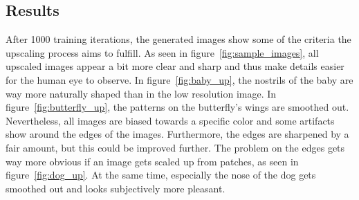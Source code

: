 \documentclass[11pt,twocolumn,twoside,paper=a4]{IEEEtran}
\begin{document}
\subsection{Results}
After 1000 training iterations, the generated images show some of the criteria the upscaling process aims to fulfill.
As seen in figure~\ref{fig:sample_images}, all upscaled images appear a bit more clear and sharp and thus make details easier for the human eye to observe.
In figure~\ref{fig:baby_up}, the nostrils of the baby are way more naturally shaped than in the low resolution image. 
In figure~\ref{fig:butterfly_up}, the patterns on the butterfly's wings are smoothed out. 
Nevertheless, all images are biased towards a specific color and some artifacts show around the edges of the images. 
Furthermore, the edges are sharpened by a fair amount, but this could be improved further.
The problem on the edges gets way more obvious if an image gets scaled up from patches, as seen in figure~\ref{fig:dog_up}. 
At the same time, especially the nose of the dog gets smoothed out and looks subjectively more pleasant.
\end{document}
